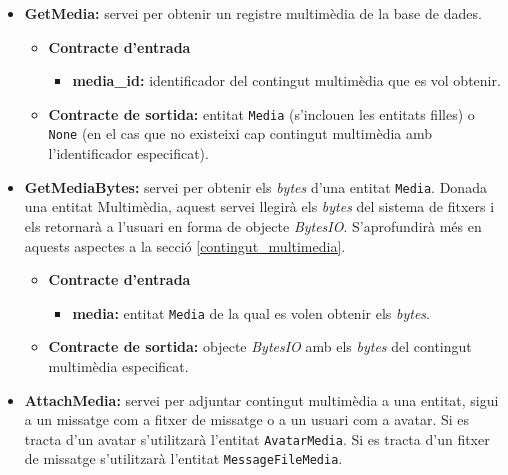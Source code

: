 		\begin{itemize}

			\item \textbf{GetMedia:} servei per obtenir un registre multimèdia de la base de dades.
				\begin{itemize}
					\item \textbf{Contracte d'entrada}
						\begin{itemize}
							\item \textbf{media\_id:} identificador del contingut multimèdia que es vol obtenir.
						\end{itemize}
					\item \textbf{Contracte de sortida:} entitat \texttt{Media} (s'inclouen les entitats filles) o \texttt{None} (en el cas que no existeixi cap contingut multimèdia amb l'identificador especificat).
				\end{itemize}
				
			\item \textbf{GetMediaBytes:} servei per obtenir els \emph{bytes} d'una entitat \texttt{Media}. Donada una entitat Multimèdia, aquest servei llegirà els \emph{bytes} del sistema de fitxers i els retornarà a l'usuari en forma de objecte \emph{BytesIO}. S'aprofundirà més en aquests aspectes a la secció \ref{contingut_multimedia}.
			
				\begin{itemize}
					\item \textbf{Contracte d'entrada}
						\begin{itemize}
							\item \textbf{media:} entitat \texttt{Media} de la qual es volen obtenir els \emph{bytes}.
						\end{itemize}
					\item \textbf{Contracte de sortida:}  objecte \emph{BytesIO} amb els \emph{bytes} del contingut multimèdia especificat.
				\end{itemize}
				
			\item \textbf{AttachMedia:} servei per adjuntar contingut multimèdia a una entitat, sigui a un missatge com a fitxer de missatge o a un usuari com a avatar. Si es tracta d'un avatar s'utilitzarà l'entitat \texttt{AvatarMedia}. Si es tracta d'un fitxer de missatge s'utilitzarà l'entitat \texttt{MessageFileMedia}.
			

\end{itemize}
